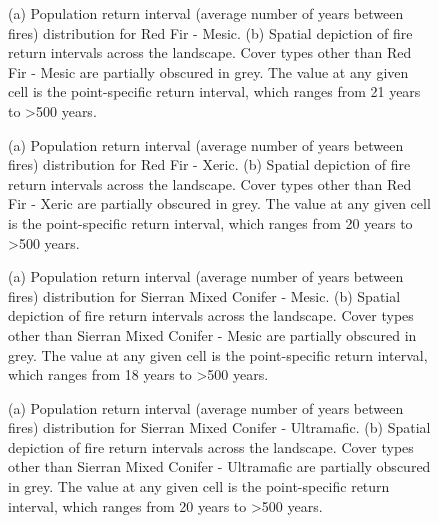 \begin{figure}[!htbp]
  \centering
  \caption{(a) Population return interval (average number of years between fires) distribution for Red Fir - Mesic.  (b) Spatial depiction of fire return intervals across the landscape. Cover types other than Red Fir - Mesic are partially obscured in grey. The value at any given cell is the point-specific return interval, which ranges from 21 years to \textgreater 500 years.}
\label{fig:preturn_rfrm}
\end{figure}

\begin{figure}[!htbp]
  \centering
  \caption{(a) Population return interval (average number of years between fires) distribution for Red Fir - Xeric.  (b) Spatial depiction of fire return intervals across the landscape. Cover types other than Red Fir - Xeric are partially obscured in grey. The value at any given cell is the point-specific return interval, which ranges from 20 years to \textgreater 500 years.}
\label{fig:preturn_rfrx}
\end{figure}

\begin{figure}[!htbp]
  \centering
  \caption{(a) Population return interval (average number of years between fires) distribution for Sierran Mixed Conifer - Mesic.  (b) Spatial depiction of fire return intervals across the landscape. Cover types other than Sierran Mixed Conifer - Mesic are partially obscured in grey. The value at any given cell is the point-specific return interval, which ranges from 18 years to \textgreater 500 years.}
\label{fig:preturn_smcm}
\end{figure}

\begin{figure}[!htbp]
  \centering
  \caption{(a) Population return interval (average number of years between fires) distribution for Sierran Mixed Conifer - Ultramafic.  (b) Spatial depiction of fire return intervals across the landscape. Cover types other than Sierran Mixed Conifer - Ultramafic are partially obscured in grey. The value at any given cell is the point-specific return interval, which ranges from 20 years to \textgreater 500 years.}
\label{fig:preturn_smcu}
\end{figure}

